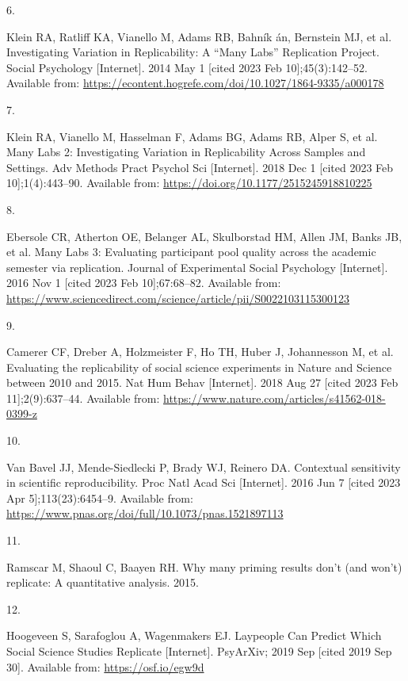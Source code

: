 \documentclass[
  english,
  a4paper,
]{article}
\newlength{\cslhangindent}
\newlength{\csllabelwidth}
\newlength{\cslentryspacingunit} %
\newenvironment{CSLReferences}[2] %
 {%
  \setlength{\parindent}{0pt}
  \ifodd #1
  \let\oldpar\par
  \def\par{\hangindent=\cslhangindent\oldpar}
  \fi
  \setlength{\parskip}{#2\cslentryspacingunit}
 }%
 {}
\newcommand{\CSLLeftMargin}[1]{\parbox[t]{\csllabelwidth}{#1}}
\newcommand{\CSLRightInline}[1]{\parbox[t]{\linewidth - \csllabelwidth}{#1}\break}
\begin{document}
\begin{CSLReferences}{0}{0}
\leavevmode{}%
\CSLLeftMargin{6. }%
\CSLRightInline{Klein RA, Ratliff KA, Vianello M, Adams RB, Bahník án, Bernstein MJ, et al. Investigating {Variation} in {Replicability}: {A} {``{Many Labs}''} {Replication Project}. Social Psychology {[}Internet{]}. 2014 May 1 {[}cited 2023 Feb 10{]};45(3):142--52. Available from: \url{https://econtent.hogrefe.com/doi/10.1027/1864-9335/a000178}}

\leavevmode{}%
\CSLLeftMargin{7. }%
\CSLRightInline{Klein RA, Vianello M, Hasselman F, Adams BG, Adams RB, Alper S, et al. Many {Labs} 2: {Investigating Variation} in {Replicability Across Samples} and {Settings}. Adv Methods Pract Psychol Sci {[}Internet{]}. 2018 Dec 1 {[}cited 2023 Feb 10{]};1(4):443--90. Available from: \url{https://doi.org/10.1177/2515245918810225}}

\leavevmode{}%
\CSLLeftMargin{8. }%
\CSLRightInline{Ebersole CR, Atherton OE, Belanger AL, Skulborstad HM, Allen JM, Banks JB, et al. Many {Labs} 3: {Evaluating} participant pool quality across the academic semester via replication. Journal of Experimental Social Psychology {[}Internet{]}. 2016 Nov 1 {[}cited 2023 Feb 10{]};67:68--82. Available from: \url{https://www.sciencedirect.com/science/article/pii/S0022103115300123}}

\leavevmode{}%
\CSLLeftMargin{9. }%
\CSLRightInline{Camerer CF, Dreber A, Holzmeister F, Ho TH, Huber J, Johannesson M, et al. Evaluating the replicability of social science experiments in {Nature} and {Science} between 2010 and 2015. Nat Hum Behav {[}Internet{]}. 2018 Aug 27 {[}cited 2023 Feb 11{]};2(9):637--44. Available from: \url{https://www.nature.com/articles/s41562-018-0399-z}}

\leavevmode{}%
\CSLLeftMargin{10. }%
\CSLRightInline{Van Bavel JJ, Mende-Siedlecki P, Brady WJ, Reinero DA. Contextual sensitivity in scientific reproducibility. Proc Natl Acad Sci {[}Internet{]}. 2016 Jun 7 {[}cited 2023 Apr 5{]};113(23):6454--9. Available from: \url{https://www.pnas.org/doi/full/10.1073/pnas.1521897113}}

\leavevmode{}%
\CSLLeftMargin{11. }%
\CSLRightInline{Ramscar M, Shaoul C, Baayen RH. Why many priming results don't (and won't) replicate: {A} quantitative analysis. 2015. }

\leavevmode{}%
\CSLLeftMargin{12. }%
\CSLRightInline{Hoogeveen S, Sarafoglou A, Wagenmakers EJ. Laypeople {Can Predict Which Social Science Studies Replicate} {[}Internet{]}. {PsyArXiv}; 2019 Sep {[}cited 2019 Sep 30{]}. Available from: \url{https://osf.io/egw9d}}


\end{CSLReferences}
\end{document}
